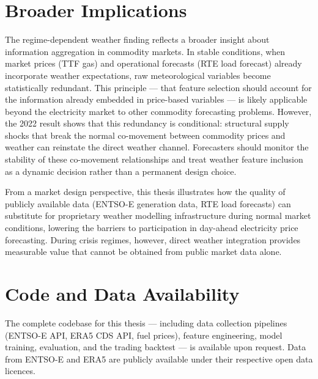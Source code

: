 \section{Broader Implications}

The regime-dependent weather finding reflects a broader insight about
information aggregation in commodity markets. In stable conditions, when market
prices (TTF gas) and operational forecasts (RTE load forecast) already
incorporate weather expectations, raw meteorological variables become
statistically redundant. This principle — that feature selection should account
for the information already embedded in price-based variables — is likely
applicable beyond the electricity market to other commodity forecasting
problems. However, the 2022 result shows that this redundancy is conditional:
structural supply shocks that break the normal co-movement between commodity
prices and weather can reinstate the direct weather channel. Forecasters should
monitor the stability of these co-movement relationships and treat weather
feature inclusion as a dynamic decision rather than a permanent design choice.

From a market design perspective, this thesis illustrates how the quality of
publicly available data (ENTSO-E generation data, RTE load forecasts) can
substitute for proprietary weather modelling infrastructure during normal market
conditions, lowering the barriers to participation in day-ahead electricity
price forecasting. During crisis regimes, however, direct weather integration
provides measurable value that cannot be obtained from public market data alone.

\section{Code and Data Availability}

The complete codebase for this thesis — including data collection pipelines (ENTSO-E API, ERA5 CDS API, fuel prices), feature engineering, model training, evaluation, and the trading backtest — is available upon request. Data from ENTSO-E and ERA5 are publicly available under their respective open data licences.
